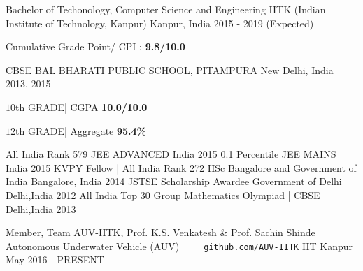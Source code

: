 \documentclass[11pt, a4paper]{awesome-cv}
\begin{document}
\makecvheader
{\fontsize{10pt}{1em}\bodyfontlight\upshape\color{text}
\begin{cventries}
  \cventry
    {Bachelor of Techonology, Computer Science and Engineering}
    {IITK (Indian Institute of Technology, Kanpur)}
    {Kanpur, India}
    {2015 - 2019 (Expected)}
    {
      \begin{cvitems}
        \item {Cumulative Grade Point/ CPI :\textbf{ 9.8/10.0} }
      \end{cvitems}
    }
  \cventry
    {CBSE}
    {BAL BHARATI PUBLIC SCHOOL, PITAMPURA}
    {New Delhi, India}
    {2013, 2015}
    {
      \begin{cvitems}
        \item {$10$th GRADE| CGPA \textbf{10.0/10.0}}      
        \item {$12$th GRADE| Aggregate \textbf{95.4\%}}  
      \end{cvitems} 
    }
\end{cventries}
{\fontsize{10pt}{1em}\bodyfontlight\upshape\color{text}
\begin{cvhonors}
  \cvhonor
    {All India Rank 579}
    {JEE ADVANCED}
    {India}
    {2015}
  \cvhonor
    {0.1 Percentile}
    {JEE MAINS}
    {India}
    {2015}
  \cvhonor
    {KVPY Fellow | All India Rank 272}
    {IISc Bangalore and Government of India}
    {Bangalore, India}
    {2014}
  \cvhonor
    {JSTSE Scholarship Awardee}
    {Government of Delhi}
    {Delhi,India}
    {2012}
  \cvhonor
    {All India Top 30 }
    {Group Mathematics Olympiad | CBSE}    
    {Delhi,India}
    {2013}
\end{cvhonors}
{\fontsize{10pt}{1em}\bodyfontlight\upshape\color{text}
\begin{cventries}
  \cventry
    {Member, Team AUV-IITK, Prof. K.S. Venkatesh \& Prof. Sachin Shinde}
    {Autonomous Underwater Vehicle (AUV)\ \ \ \ \ \texttt{\href{https://github.com/AUV-IITK}{github.com/AUV-IITK}}}
    {IIT Kanpur}
    {May 2016 - PRESENT}
    {
      \begin{cvitems}

\end{cvitems}}
\end{cventries}}}}
\end{document}
